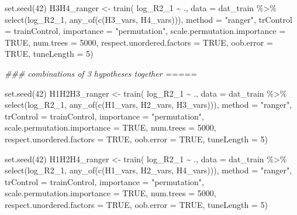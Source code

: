 \documentclass[
  letterpaper,
  DIV=11,
  numbers=noendperiod]{scrreprt}
\newenvironment{Shaded}{\begin{snugshade}}{\end{snugshade}}
\newcommand{\AttributeTok}[1]{\textcolor[rgb]{0.40,0.45,0.13}{#1}}
\newcommand{\ConstantTok}[1]{\textcolor[rgb]{0.56,0.35,0.01}{#1}}
\newcommand{\DecValTok}[1]{\textcolor[rgb]{0.68,0.00,0.00}{#1}}
\newcommand{\DocumentationTok}[1]{\textcolor[rgb]{0.37,0.37,0.37}{\textit{#1}}}
\newcommand{\FunctionTok}[1]{\textcolor[rgb]{0.28,0.35,0.67}{#1}}
\newcommand{\NormalTok}[1]{\textcolor[rgb]{0.00,0.23,0.31}{#1}}
\newcommand{\OtherTok}[1]{\textcolor[rgb]{0.00,0.23,0.31}{#1}}
\newcommand{\SpecialCharTok}[1]{\textcolor[rgb]{0.37,0.37,0.37}{#1}}
\newcommand{\StringTok}[1]{\textcolor[rgb]{0.13,0.47,0.30}{#1}}
\begin{document}
\begin{Shaded}
\begin{Highlighting}[]
\FunctionTok{set.seed}\NormalTok{(}\DecValTok{42}\NormalTok{)}
\NormalTok{H3H4\_ranger }\OtherTok{\textless{}{-}} \FunctionTok{train}\NormalTok{(}
\NormalTok{    log\_R2\_1 }\SpecialCharTok{\textasciitilde{}}\NormalTok{ .,}
    \AttributeTok{data =}\NormalTok{ dat\_train }\SpecialCharTok{\%\textgreater{}\%} \FunctionTok{select}\NormalTok{(log\_R2\_1, }\FunctionTok{any\_of}\NormalTok{(}\FunctionTok{c}\NormalTok{(H3\_vars, H4\_vars))),}
    \AttributeTok{method =} \StringTok{"ranger"}\NormalTok{,}
    \AttributeTok{trControl =}\NormalTok{ trainControl,}
    \AttributeTok{importance =} \StringTok{"permutation"}\NormalTok{,}
    \AttributeTok{scale.permutation.importance =} \ConstantTok{TRUE}\NormalTok{,}
    \AttributeTok{num.trees =} \DecValTok{5000}\NormalTok{,}
    \AttributeTok{respect.unordered.factors =} \ConstantTok{TRUE}\NormalTok{,}
    \AttributeTok{oob.error =} \ConstantTok{TRUE}\NormalTok{,}
    \AttributeTok{tuneLength =} \DecValTok{5}\NormalTok{)}


\DocumentationTok{\#\#\# combinations of 3 hypotheses together =====}

\FunctionTok{set.seed}\NormalTok{(}\DecValTok{42}\NormalTok{)}
\NormalTok{H1H2H3\_ranger }\OtherTok{\textless{}{-}} \FunctionTok{train}\NormalTok{(}
\NormalTok{    log\_R2\_1 }\SpecialCharTok{\textasciitilde{}}\NormalTok{ .,}
    \AttributeTok{data =}\NormalTok{ dat\_train }\SpecialCharTok{\%\textgreater{}\%} \FunctionTok{select}\NormalTok{(log\_R2\_1, }\FunctionTok{any\_of}\NormalTok{(}\FunctionTok{c}\NormalTok{(H1\_vars, H2\_vars, H3\_vars))),}
    \AttributeTok{method =} \StringTok{"ranger"}\NormalTok{,}
    \AttributeTok{trControl =}\NormalTok{ trainControl,}
    \AttributeTok{importance =} \StringTok{"permutation"}\NormalTok{,}
    \AttributeTok{scale.permutation.importance =} \ConstantTok{TRUE}\NormalTok{,}
    \AttributeTok{num.trees =} \DecValTok{5000}\NormalTok{,}
    \AttributeTok{respect.unordered.factors =} \ConstantTok{TRUE}\NormalTok{,}
    \AttributeTok{oob.error =} \ConstantTok{TRUE}\NormalTok{,}
    \AttributeTok{tuneLength =} \DecValTok{5}\NormalTok{)}

\FunctionTok{set.seed}\NormalTok{(}\DecValTok{42}\NormalTok{)}
\NormalTok{H1H2H4\_ranger }\OtherTok{\textless{}{-}} \FunctionTok{train}\NormalTok{(}
\NormalTok{    log\_R2\_1 }\SpecialCharTok{\textasciitilde{}}\NormalTok{ .,}
    \AttributeTok{data =}\NormalTok{ dat\_train }\SpecialCharTok{\%\textgreater{}\%} \FunctionTok{select}\NormalTok{(log\_R2\_1, }\FunctionTok{any\_of}\NormalTok{(}\FunctionTok{c}\NormalTok{(H1\_vars, H2\_vars, H4\_vars))),}
    \AttributeTok{method =} \StringTok{"ranger"}\NormalTok{,}
    \AttributeTok{trControl =}\NormalTok{ trainControl,}
    \AttributeTok{importance =} \StringTok{"permutation"}\NormalTok{,}
    \AttributeTok{scale.permutation.importance =} \ConstantTok{TRUE}\NormalTok{,}
    \AttributeTok{num.trees =} \DecValTok{5000}\NormalTok{,}
    \AttributeTok{respect.unordered.factors =} \ConstantTok{TRUE}\NormalTok{,}
    \AttributeTok{oob.error =} \ConstantTok{TRUE}\NormalTok{,}
    \AttributeTok{tuneLength =} \DecValTok{5}\NormalTok{)}


\end{Highlighting}
\end{Shaded}
\end{document}
